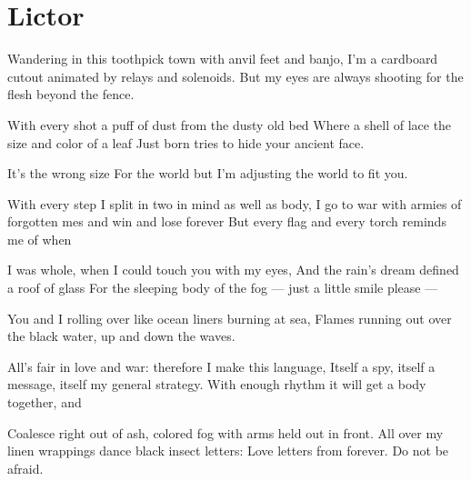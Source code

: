 \documentclass[english,11pt,letterpaper,onecolumn,parskip=full]{scrbook}
\begin{document}
\newpage
\section{Lictor}

\begin{poem}
\begin{stanza}
Wandering in this toothpick town with anvil feet and banjo,\verseline
I'm a cardboard cutout animated by relays and solenoids.\verseline
But my eyes are always shooting for the flesh beyond the fence.
\end{stanza}

\begin{stanza}
With every shot a puff of dust from the dusty old bed\verseline
Where a shell of lace the size and color of a leaf\verseline
Just born tries to hide your ancient face.
\end{stanza}

\begin{stanza}
It's the wrong size\verseline
For the world but I'm adjusting the world to fit you.
\end{stanza}

\begin{stanza}
With every step I split in two in mind as well as body,\verseline
I go to war with armies of forgotten mes and win and lose forever\verseline
But every flag and every torch reminds me of when
\end{stanza}

\begin{stanza}
I was whole, when I could touch you with my eyes,\verseline
And the rain's dream defined a roof of glass\verseline
For the sleeping body of the fog --- just a little smile please ---
\end{stanza}

\begin{stanza}
You and I rolling over like ocean liners burning at sea,\verseline
Flames running out over the black water, up and down the waves.
\end{stanza}

\begin{stanza}
All's fair in love and war:  therefore I make this language,\verseline
Itself a spy, itself a message, itself my general strategy.\verseline
With enough rhythm it will get a body together, and
\end{stanza}

\begin{stanza}
Coalesce right out of ash, colored fog with arms held out in front.\verseline
All over my linen wrappings dance black insect letters:\verseline
Love letters from forever.  Do not be afraid.
\end{stanza}


\end{poem}
\end{document}
